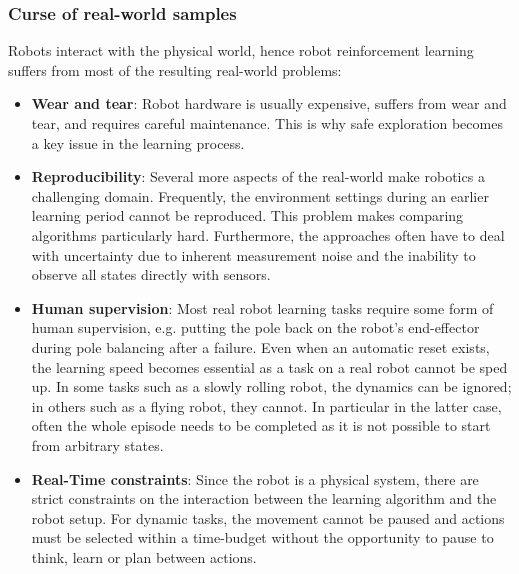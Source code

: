 \subsubsection{Curse of real-world samples}
Robots interact with the physical world, hence robot reinforcement learning suffers from most of the resulting real-world problems:
\begin{itemize}
\item \textbf{Wear and tear}:
Robot hardware is usually expensive, suffers from wear and tear, and requires careful maintenance. This is why safe exploration
becomes a key issue in the learning process.

\item \textbf{Reproducibility}:
Several more aspects of the real-world make robotics a challenging domain. Frequently, the environment settings during an earlier 
learning period cannot be reproduced. This problem makes comparing algorithms particularly hard. Furthermore, the approaches often have to deal 
with uncertainty due to inherent measurement noise and the inability to observe all states directly with sensors.

\item \textbf{Human supervision}:
Most real robot learning tasks require some form of human supervision, e.g. putting the pole back on the robot's end-effector during pole balancing
 after a failure. Even when an automatic reset exists, the learning speed becomes essential as a task on a real robot cannot be sped up.
In some tasks such as a slowly rolling robot, the dynamics can be ignored; in others such as a flying robot, they cannot. In particular in the latter case,
often the whole episode needs to be completed as it is not possible to start from arbitrary states.

\item \textbf{Real-Time constraints}:
Since the robot is a physical system, there are strict constraints on the interaction between the learning algorithm
and the robot setup. For dynamic tasks, the movement cannot be paused and actions must be selected within a time-budget without 
the opportunity to pause to think, learn or plan between actions.


\end{itemize}
